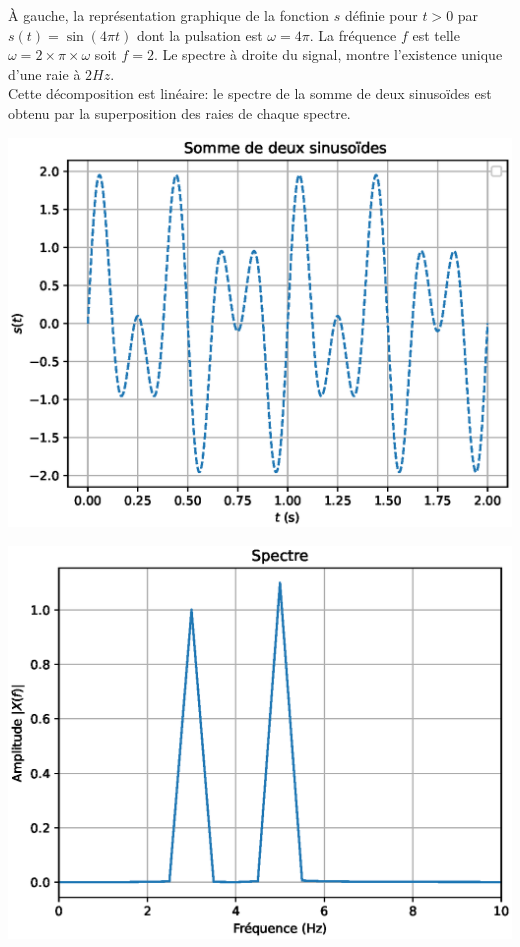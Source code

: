 \documentclass[11pt,a4paper]{article}
\begin{document}
À gauche, la représentation graphique de la fonction $s$ définie pour $t>0$ par $s(t)=\sin(4\pi t)$ dont la pulsation est $\omega = 4\pi$. La fréquence $f$ est telle $\omega = 2\times \pi\times \omega $ soit $f=2$. Le spectre à droite du signal, montre l'existence unique d'une raie à $2Hz$.\\
Cette \og décomposition \fg{} est linéaire: le spectre de la somme de deux sinusoïdes est obtenu par la superposition des raies de chaque spectre.\\
\begin{minipage}{0.5\linewidth}
\includegraphics[scale=0.5]{somme_sin.eps} 

\end{minipage}\hfill
\begin{minipage}{0.5\linewidth}
\includegraphics[scale=0.5]{somme_sin_spectre.eps} 
\end{minipage}
\end{document}
